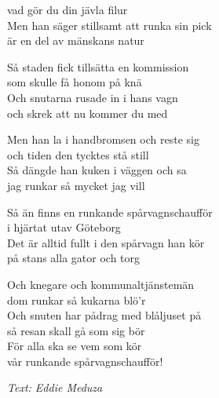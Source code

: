 vad gör du din jävla filur\\
Men han säger stillsamt att runka sin pick\\
är en del av mänskans natur\par
\vspace{8pt}
Så staden fick tillsätta en kommission\\
som skulle få honom på knä\\
Och snutarna rusade in i hans vagn\\
och skrek att nu kommer du med\par
\vspace{8pt}
Men han la i handbromsen och reste sig\\
och tiden den tycktes stå still\\
Så dängde han kuken i väggen och sa\\
jag runkar så mycket jag vill\par
\vspace{8pt}
Så än finns en runkande spårvagnschaufför\\
i hjärtat utav Göteborg\\
Det är alltid fullt i den spårvagn han kör\\
på stans alla gator och torg\par
\vspace{8pt}
Och knegare och kommunaltjänstemän\\
dom runkar så kukarna blö’r \\
Och snuten har pådrag med blåljuset på\\
så resan skall gå som sig bör\\
För alla ska se vem som kör\\
vår runkande spårvagnschaufför!\par
\vspace{10pt}
{\footnotesize\textit{Text: Eddie Meduza}}

